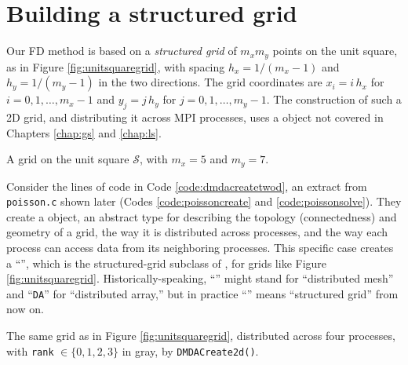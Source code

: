 \section{Building a structured grid}

Our FD method is based on a \emph{structured grid} of $m_x m_y$ points on the unit square, as in Figure \ref{fig:unitsquaregrid}, with spacing $h_x=1/(m_x-1)$ and $h_y=1/(m_y-1)$ in the two directions.  The grid coordinates are $x_i = i\, h_x$ for $i = 0,1,\dots,m_x-1$ and $y_j = j\, h_y$ for $j=0,1,\dots,m_y-1$.  The construction of such a 2D grid, and distributing it across MPI processes, uses a \PETSc object not covered in Chapters \ref{chap:gs} and \ref{chap:ls}.

\begin{marginfigure}

\caption{A grid on the unit square $\mathcal{S}$, with $m_x=5$ and $m_y=7$.}
\label{fig:unitsquaregrid}
\end{marginfigure}

Consider the lines of code in Code \ref{code:dmdacreatetwod}, an extract from \texttt{poisson.c} shown later (Codes \ref{code:poissoncreate} and \ref{code:poissonsolve}).  They create a \PETSc \pDM object, an abstract type for describing the topology (connectedness) and geometry of a grid, the way it is distributed across \MPI processes, and the way each process can access data from its neighboring processes.  This specific case creates a ``\pDMDA'', which is the structured-grid subclass of \pDMs, for grids like Figure \ref{fig:unitsquaregrid}.  Historically-speaking, ``\pDM'' might stand for ``distributed mesh'' and ``\texttt{DA}'' for ``distributed array,'' but in practice ``\pDMDA'' means ``structured grid'' from now on.


\begin{marginfigure}

\caption{The same grid as in Figure \ref{fig:unitsquaregrid}, distributed across four \MPI processes, with \texttt{rank} $\in \{0,1,2,3\}$ in gray, by \texttt{DMDACreate2d()}.}
\label{fig:unitsquaregridparallel}
\end{marginfigure}

